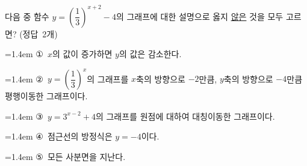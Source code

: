다음 중 함수 $y=\left(\dfrac{1}{3}\right)^{x+2}-4$의 그래프에 대한 설명으로 옳지 \underline{않은} 것을 모두 고르면? \mbox{(정답 2개)}
\par\medskip\par\noindent\hangindent=1.4em {\small ①}\ $x$의 값이 증가하면 $y$의 값은 감소한다.\par\noindent\hangindent=1.4em {\small ②}\ $y=\left(\dfrac{1}{3}\right)^{x}$의 그래프를 $x$축의 방향으로 $-2$만큼, $y$축의 방향으로 $-4$만큼 평행이동한 그래프이다.\par\noindent\hangindent=1.4em {\small ③}\ $y=3^{x-2}+4$의 그래프를 원점에 대하여 대칭이동한 그래프이다.\par\noindent\hangindent=1.4em {\small ④}\ 점근선의 방정식은 $y=-4$이다.\par\noindent\hangindent=1.4em {\small ⑤}\ 모든 사분면을 지난다.\par\medskip
